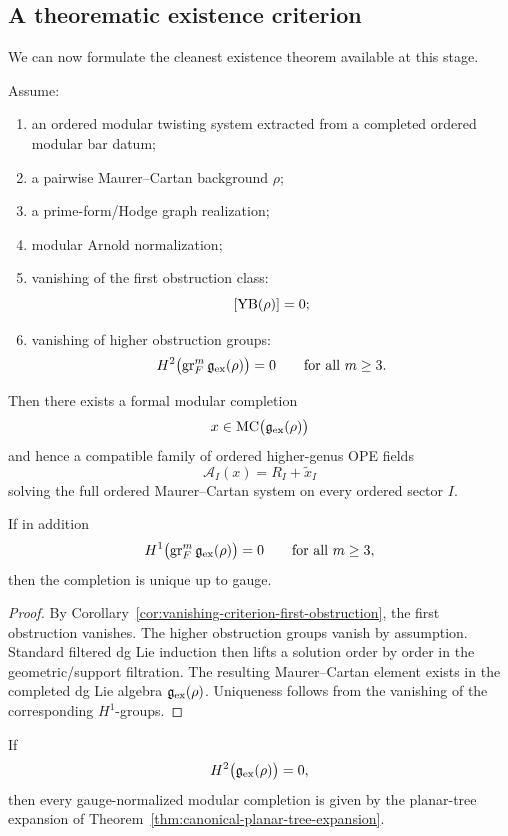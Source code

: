 \subsection{A theorematic existence criterion}

We can now formulate the cleanest existence theorem available at this stage.

\begin{theorem}
\label{thm:formal-existence-of-modular-dg-shifted-yangians}
Assume:
\begin{enumerate}
\item
an ordered modular twisting system extracted from a completed ordered modular bar datum;
\item
a pairwise Maurer--Cartan background $\rho$;
\item
a prime-form/Hodge graph realization;
\item
modular Arnold normalization;
\item
vanishing of the first obstruction class:
\[
[\mathrm{YB}(\rho)]=0;
\]
\item
vanishing of higher obstruction groups:
\[
H^2\bigl(\operatorname{gr}_F^m\mathfrak g_{\mathrm{ex}}(\rho)\bigr)=0
\qquad\text{for all }m\ge 3.
\]
\end{enumerate}
Then there exists a formal modular completion
\[
x\in \operatorname{MC}\bigl(\mathfrak g_{\mathrm{ex}}(\rho)\bigr)
\]
and hence a compatible family of ordered higher-genus OPE fields
\[
\mathcal A_I(x)=R_I+\widetilde x_I
\]
solving the full ordered Maurer--Cartan system on every ordered sector $I$.

If in addition
\[
H^1\bigl(\operatorname{gr}_F^m\mathfrak g_{\mathrm{ex}}(\rho)\bigr)=0
\qquad\text{for all }m\ge 3,
\]
then the completion is unique up to gauge.
\end{theorem}

\begin{proof}
By Corollary~\ref{cor:vanishing-criterion-first-obstruction}, the first obstruction vanishes.
The higher obstruction groups vanish by assumption. Standard filtered dg Lie induction then lifts a
solution order by order in the geometric/support filtration. The resulting Maurer--Cartan element
exists in the completed dg Lie algebra $\mathfrak g_{\mathrm{ex}}(\rho)$.
Uniqueness follows from the vanishing of the corresponding $H^1$-groups.
\end{proof}

\begin{corollary}
\label{cor:explicit-tree-formula-unobstructed}
If
\[
H^2\bigl(\mathfrak g_{\mathrm{ex}}(\rho)\bigr)=0,
\]
then every gauge-normalized modular completion is given by the planar-tree expansion of
Theorem~\ref{thm:canonical-planar-tree-expansion}.
\end{corollary}

